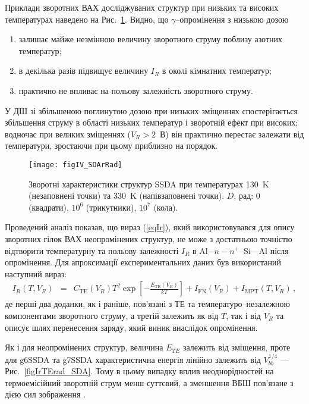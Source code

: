 Приклади зворотних ВАХ досліджуваних структур при низьких та високих температурах наведено на Рис.~\ref{figIV_SDArRad}.
Видно, що $\gamma$--опромінення з низькою дозою
\begin{enumerate}[label=\asbuk*),leftmargin=0em,itemindent=1.5em]
\item залишає майже незмінною величину зворотного струму поблизу азотних температур;
\item в декілька разів підвищує величину $I_R$ в околі кімнатних температур;
\item практично не впливає на польову залежність зворотного струму.
\end{enumerate}
У ДШ зі збільшеною поглинутою дозою при низьких зміщеннях спостерігається збільшення струму в області низьких температур і зворотній ефект при високих;
водночас при великих зміщеннях ($V_R>2$~В) він практично перестає залежати від температури, зростаючи при цьому приблизно на порядок.


\begin{figure}
\center
\texttt{[image: figIV\_SDArRad]}
\caption{\label{figIV_SDArRad}
Зворотні характеристики структур SSDA при температурах 130~K (незаповнені точки)
та 330~K (напівзаповнені точки).
$D$, рад: 0 (квадрати), $10^6$ (трикутники), $10^7$ (кола).
}%
\end{figure}

Проведений аналіз показав, що вираз (\ref{eqIr}), який використовувався для опису зворотних гілок ВАХ неопромінених структур,
не може з достатньою точністю відтворити температурну та польову залежності $I_R$ в Al$-n-n^+$--Si---Al після опромінення.
Для апроксимації експериментальних даних був використаний наступний вираз:
\begin{eqnarray}
\label{eqIrRad}
I_R(T,V_R)&=&C_\mathrm{TE}(V_R)T^2\exp\left[-\frac{E_\mathrm{TE}(V_R)}{kT}\right]+I_\mathrm{FN}(V_R)+I_\mathrm{MPT}(T,V_R)\,,
\end{eqnarray}
де
перші два доданки, як і раніше,
пов'язані з ТЕ та температуро--незалежною компонентами зворотного струму,
а третій залежить як від $T$, так і від $V_R$ та описує шлях перенесення заряду, який виник внаслідок опромінення.

Як і для неопромінених структур,
величина $E_{TE}$ залежить від зміщення, проте для g6SSDA та g7SSDA характеристична енергія лінійно залежить від $V_{bb}^{1/4}$
 --- Рис.~\ref{figIrTErad_SDA}.
Тому в цьому випадку вплив неоднорідностей
на термоемісійний зворотній струм менш суттєвий, а зменшення ВБШ пов’язане з дією сил зображення \cite{Rhoderick1988,Andrews}.


